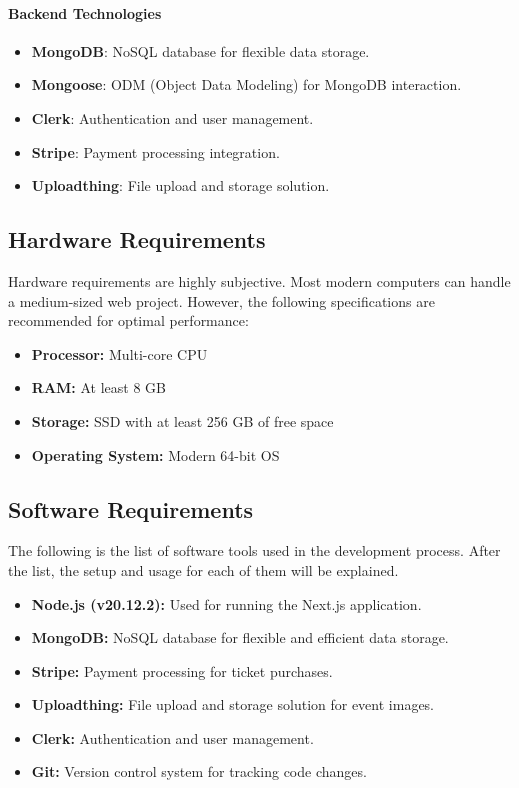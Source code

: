 \paragraph{Backend Technologies}
\begin{itemize}
    \item \textbf{MongoDB}: NoSQL database for flexible data storage.
    \item \textbf{Mongoose}: ODM (Object Data Modeling) for MongoDB interaction.
    \item \textbf{Clerk}: Authentication and user management.
    \item \textbf{Stripe}: Payment processing integration.
    \item \textbf{Uploadthing}: File upload and storage solution.
\end{itemize}


\subsection{Hardware Requirements}
Hardware requirements are highly subjective. Most modern computers can handle a medium-sized web project. However, the following specifications are recommended for optimal performance:

\begin{itemize}
    \item \textbf{Processor:} Multi-core CPU
    \item \textbf{RAM:} At least 8 GB
    \item \textbf{Storage:} SSD with at least 256 GB of free space
    \item \textbf{Operating System:} Modern 64-bit OS
\end{itemize}


\subsection{Software Requirements}

The following is the list of software tools used in the development process. After the list, the setup and usage for each of them will be explained.

\begin{itemize}
    \item \textbf{Node.js (v20.12.2):} Used for running the Next.js application.
    \item \textbf{MongoDB:} NoSQL database for flexible and efficient data storage.
    \item \textbf{Stripe:} Payment processing for ticket purchases.
    \item \textbf{Uploadthing:} File upload and storage solution for event images.
    \item \textbf{Clerk:} Authentication and user management.
    \item \textbf{Git:}\cite{git} Version control system for tracking code changes.
\end{itemize}



